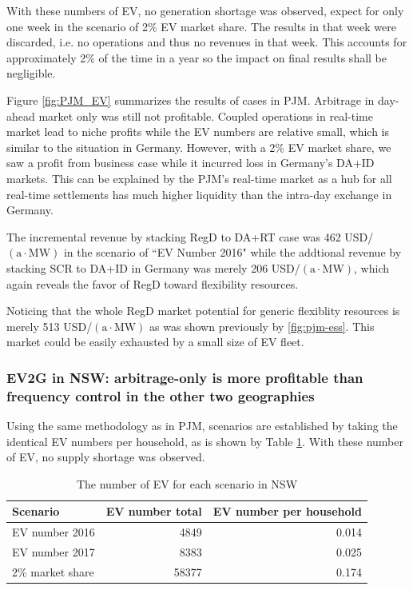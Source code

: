 With these numbers of EV, no generation shortage was observed, expect for only one week in the scenario of 2\% EV market share. The results in that week were discarded, i.e. no operations and thus no revenues in that week. This accounts for approximately 2\% of the time in a year so the impact on final results shall be negligible.

Figure \ref{fig:PJM_EV} summarizes the results of cases in PJM. Arbitrage in day-ahead market only was still not profitable. Coupled operations in real-time market lead to niche profits while the EV numbers are relative small, which is similar to the situation in Germany. However, with a 2\% EV market share, we saw a profit from business case while it incurred loss in Germany's DA+ID markets. This can be explained by the PJM's real-time market as a hub for all real-time settlements has much higher liquidity than the intra-day exchange in Germany.

The incremental revenue by stacking RegD to DA+RT case was 462 USD/$(\text{a} \cdot \text{MW})$ in the scenario of ``EV Number 2016" while the addtional revenue by stacking SCR to DA+ID in Germany was merely 206 USD/$(\text{a} \cdot \text{MW})$, which again reveals the favor of RegD toward flexibility resources. 

Noticing that the whole RegD market potential for generic flexiblity resources is merely 513 USD/$(\text{a} \cdot \text{MW})$ as was shown previously by \ref{fig:pjm-ess}. This market could be easily exhausted by a small size of EV fleet. 
 
\subsubsection{EV2G  in NSW: arbitrage-only is more profitable than frequency control in the other two geographies}

Using the same methodology as in PJM, scenarios are established by taking the identical EV numbers per household, as is shown by Table \ref{tab:ev-number-scenario-nsw}. With these number of EV, no supply shortage was observed.  

\begin{table}[h!]
	\centering
	\begin{tabular}{ l r r }
		\hline
		\textbf{Scenario} & \textbf{EV number total} & \textbf{EV number per household} \\
		\hline
		EV number 2016 &  \num{4849} & \num{0.014} \\
		EV number 2017 &  \num{8383} & \num{0.025} \\
		2\% market share &  \num{58377} & \num{0.174} \\
		\hline
	\end{tabular}
	\caption{The number of EV for each scenario in NSW}\label{tab:ev-number-scenario-nsw}
\end{table}

